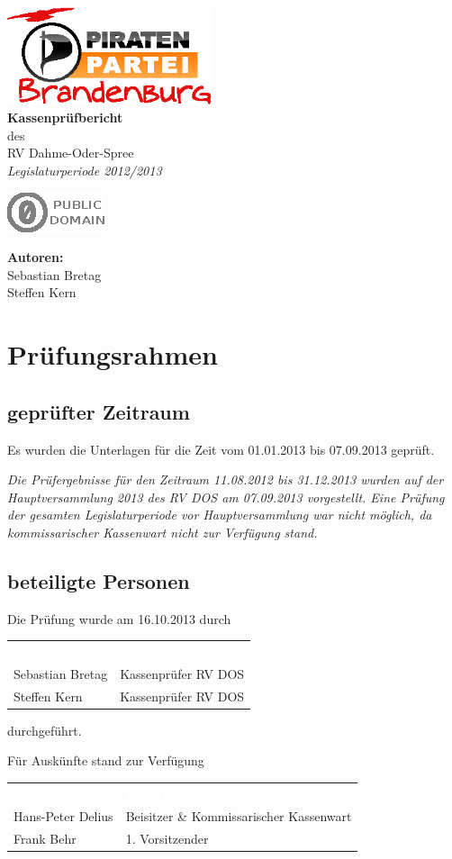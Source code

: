 \documentclass[%
	titlepage,oneside,12pt,headlines=1.5,numbers=noenddot, chapterprefix=false,parskip=full-,DIV=14,pagesize]{scrreprt}
\makeatletter
\newcommand*\@lizenz{
		\includegraphics[scale=2.5]{./pd.eps}
	}
\renewcommand\maketitle{
	\begingroup
		\begin{titlepage}
			\begin{center}
					\includegraphics[width=6cm]{logo}\\[4cm]
				{\bfseries
					\makeatletter
						\Huge Kassenprüfbericht
					\makeatother
				}\\[5mm]
				\makeatletter
					{\Large des}\\[5mm]
					{\Large RV Dahme-Oder-Spree}\\[50mm]
					\textit{\Large Legislaturperiode 2012/2013 }
				\makeatother
					
			\end{center}
    		\vspace*{\fill} 
    		\begin{minipage}[b]{8cm}
    		\begin{flushleft}
    			\makeatletter
    				\@lizenz
    			\makeatother
    		\end{flushleft}
    	\end{minipage}
    		\hfill
    		\begin{minipage}[b]{8cm} 
    			\begin{flushright}
    				\textbf{Autoren:}\\[2mm]
    				Sebastian Bretag\\
    				Steffen Kern
    			\end{flushright}
    		\end{minipage}
    	\end{titlepage}
	\endgroup
	\pagebreak
	\pagestyle{plain}
	\onehalfspacing 
	\pagenumbering{arabic}
	\setcounter{page}{1}
	\tableofcontents
	\pagebreak
}
\renewcommand{\arraystretch}{1.2}%
\makeatother
\begin{document}
 
\maketitle

\chapter{Prüfungsrahmen}
\section{geprüfter Zeitraum}
Es wurden die Unterlagen für die Zeit vom 01.01.2013 bis 07.09.2013 geprüft.

\textit{Die Prüfergebnisse für den Zeitraum 11.08.2012 bis 31.12.2013 wurden auf der Hauptversammlung 2013 des RV DOS am 07.09.2013 vorgestellt. Eine Prüfung der gesamten Legislaturperiode vor Hauptversammlung war nicht möglich, da kommissarischer Kassenwart nicht zur Verfügung stand.}
\section{beteiligte Personen}
Die Prüfung wurde am 16.10.2013 durch
\renewcommand{\arraystretch}{1.2}%
\setlength{\arrayrulewidth}{1.5pt}%
%
\begin{longtable}[ht]{|p{} p{}|}
\hline\rowcolor{pirateorange} 
	\textcolor{white}{\textbf{Name}} & \textcolor{white}{\textbf{Funktion}}  \\
        Sebastian Bretag & Kassenprüfer RV DOS \\ 
        Steffen Kern  & Kassenprüfer RV DOS  \\
\hline
\end{longtable}\vspace{-1.25em}
durchgeführt.

Für Auskünfte stand zur Verfügung
\renewcommand{\arraystretch}{1.2}%
\setlength{\arrayrulewidth}{1.5pt}%
%
\begin{longtable}[ht]{|p{} p{}|}
\hline\rowcolor{pirateorange} 
	\textcolor{white}{\textbf{Name}} & \textcolor{white}{\textbf{Funktion}}  \\
        Hans-Peter Delius & Beisitzer \& Kommissarischer Kassenwart  \\ 
        Frank Behr & 1. Vorsitzender \\\hline
\end{longtable}\vspace{-1.25em}
\end{document}
